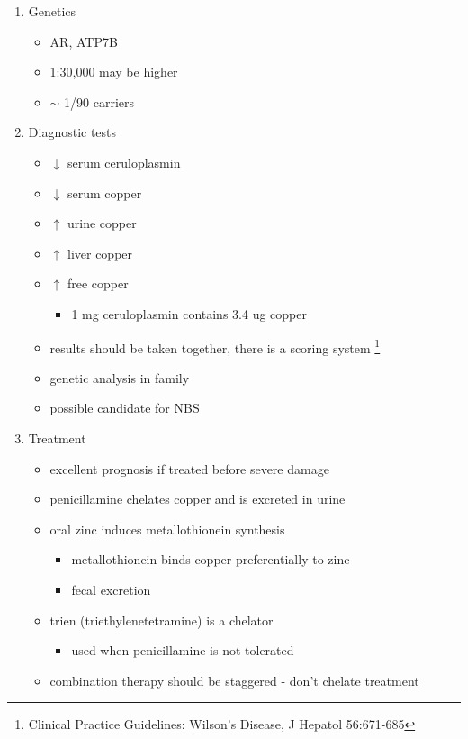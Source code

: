\documentclass{scrartcl}
\begin{document}
\begin{enumerate}
\item Genetics
\label{sec:org6b0998a}
\begin{itemize}
\item AR, ATP7B
\item 1:30,000 may be higher
\item \(\sim\) 1/90 carriers
\end{itemize}

\item Diagnostic tests
\label{sec:orged24bdc}
\begin{itemize}
\item \(\downarrow\) serum ceruloplasmin
\item \(\downarrow\) serum copper
\item \(\uparrow\) urine copper
\item \(\uparrow\) liver copper
\item \(\uparrow\) free copper
\begin{itemize}
\item 1 mg ceruloplasmin contains 3.4 ug copper
\end{itemize}
\item results should be taken together, there is a scoring system \footnote{Clinical Practice Guidelines: Wilson's Disease, J Hepatol 56:671-685}
\item genetic analysis in family
\item possible candidate for NBS
\end{itemize}

\item Treatment
\label{sec:org17b0713}
\begin{itemize}
\item excellent prognosis if treated before severe damage
\item penicillamine chelates copper and is excreted in urine
\item oral zinc induces metallothionein synthesis
\begin{itemize}
\item metallothionein binds copper preferentially to zinc
\item fecal excretion
\end{itemize}
\item trien (triethylenetetramine) is a chelator
\begin{itemize}
\item used when penicillamine is not tolerated
\end{itemize}
\item combination therapy should be staggered - don't chelate treatment
\end{itemize}
\end{enumerate}
\end{document}
